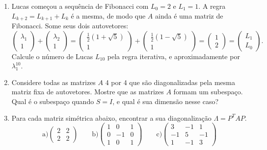 \documentclass[12pt]{article}
\begin{document}
\begin{enumerate}
\item Lucas começou a sequência de Fibonacci com $L_0=2$ e $L_1=1$. A regra $L_{k+2}=L_{k+1}+L_k$ é a mesma, de modo que $A$ ainda é uma matriz de Fibonacci. Some seus dois autovetores:
  \begin{equation*}
    \begin{pmatrix}
        \lambda_1\\
        1
      \end{pmatrix}
      +
      \begin{pmatrix}
        \lambda_2\\
        1
      \end{pmatrix}
      =
      \begin{pmatrix}
        \frac{1}{2} (1+\sqrt{5})\\
        1
      \end{pmatrix}
      +
      \begin{pmatrix}
        \frac{1}{2} (1-\sqrt{5})\\
        1
      \end{pmatrix}
      =
      \begin{pmatrix}
        1\\
        2
      \end{pmatrix}
      =
      \begin{pmatrix}
        L_1\\
        L_0
      \end{pmatrix}.
  \end{equation*}
  Calcule o número de Lucas $L_{10}$ pela regra iterativa, e aproximadamente por $\lambda_1^{10}$.

\item Considere todas as matrizes $A$ 4 por 4 que são diagonalizadas pela mesma matriz fixa de autovetores. Mostre que as matrizes $A$ formam um subespaço. Qual é o subespaço quando $S=I$, e qual é sua dimensão nesse caso?

\item Para cada matriz simétrica abaixo, encontrar a sua diagonalização $\Lambda = P^TAP$. 
\begin{equation*}
   \text{a)} \begin{pmatrix} 2 & 2 \\2 & 2\end{pmatrix} \qquad \text{b)} \begin{pmatrix} 1 & 0 & 1\\0 & -1 & 0\\1 & 0 & 1\end{pmatrix} \qquad \text{c)} \begin{pmatrix} 3 & -1 & 1\\-1 & 5 & -1\\1 & -1 & 3\end{pmatrix}
\end{equation*}


\end{enumerate}
\end{document}
